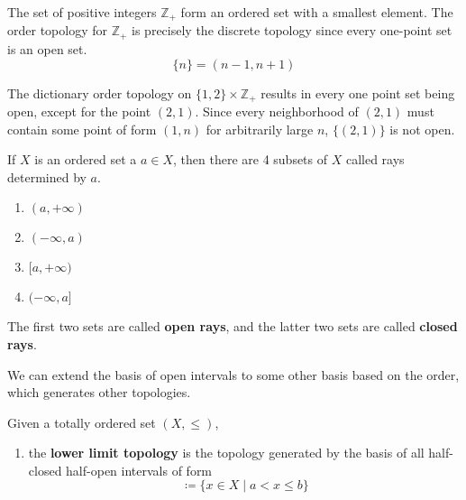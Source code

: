   \begin{example}
    The set of positive integers $\mathbb{Z}_+$ form an ordered set with a smallest element. The order topology for $\mathbb{Z}_+$ is precisely the discrete topology since every one-point set is an open set. 
    \begin{equation}
      \{n\} = (n-1, n+1)
    \end{equation}
  \end{example}

  \begin{example}
    The dictionary order topology on $\{1, 2\} \times \mathbb{Z}_+$ results in every one point set being open, except for the point $(2, 1)$. Since every neighborhood of $(2,1)$ must contain some point of form $(1, n)$ for arbitrarily large $n$, $\{(2,1)\}$ is not open. 
  \end{example}

  \begin{definition}
    If $X$ is an ordered set a $a \in X$, then there are 4 subsets of $X$ called rays determined by $a$. 
    \begin{enumerate}
      \item $(a, +\infty)$ 
      \item $(-\infty, a)$
      \item $[a, +\infty)$
      \item $(-\infty, a]$
    \end{enumerate}
    The first two sets are called \textbf{open rays}, and the latter two sets are called \textbf{closed rays}. 
  \end{definition}

  We can extend the basis of open intervals to some other basis based on the order, which generates other topologies. 

  \begin{example}
    Given a totally ordered set $(X, \leq)$, 
    \begin{enumerate}
      \item the \textbf{lower limit topology} is the topology generated by the basis of all half-closed half-open intervals of form 
      \begin{equation}
        [a, b) \coloneqq \{ x \in X \mid a \leq x < b \}
      \end{equation}
      \item the \textbf{upper limit topology} is the topology generated by the basis of all half-open half-closed intervals of form 
      \begin{equation}
        (a, b] \coloneqq \{ x \in X \mid a < x \leq b \}
      \end{equation}
    \end{enumerate}
  \end{example}

